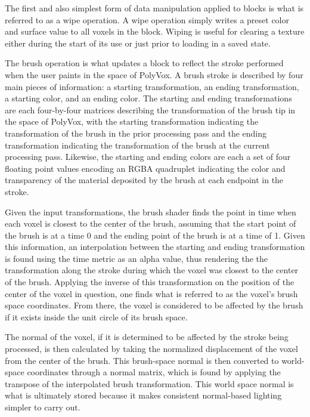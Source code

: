 \documentclass[onecolumn, draftclsnofoot,10pt, compsoc]{IEEEtran}
\newcounter{threesection}[subsubsection]
\newcounter{foursection}[threesection]
\begin{document}

The first and also simplest form of data manipulation applied to blocks is what is referred to as a wipe operation.
A wipe operation simply writes a preset color and surface value to all voxels in the block.
Wiping is useful for clearing a texture either during the start of its use or just prior to loading in a saved state.

The brush operation is what updates a block to reflect the stroke performed when the user paints in the space of PolyVox.
A brush stroke is described by four main pieces of information: a starting transformation, an ending transformation, a starting color, and an ending color.
The starting and ending transformations are each four-by-four matrices describing the transformation of the brush tip in the space of PolyVox, with the starting transformation indicating the transformation of the brush in the prior processing pass and the ending transformation indicating the transformation of the brush at the current processing pass.
Likewise, the starting and ending colors are each a set of four floating point values encoding an RGBA quadruplet indicating the color and transparency of the material deposited by the brush at each endpoint in the stroke.

Given the input transformations, the brush shader finds the point in time when each voxel is closest to the center of the brush, assuming that the start point of the brush is at a time 0 and the ending point of the brush is at a time of 1.
Given this information, an interpolation between the starting and ending transformation is found using the time metric as an alpha value, thus rendering the the transformation along the stroke during which the voxel was closest to the center of the brush.
Applying the inverse of this transformation on the position of the center of the voxel in question, one finds what is referred to as the voxel’s brush space coordinates.
From there, the voxel is considered to be affected by the brush if it exists inside the unit circle of its brush space.

The normal of the voxel, if it is determined to be affected by the stroke being processed, is then calculated by taking the normalized displacement of the voxel from the center of the brush.
This brush-space normal is then converted to world-space coordinates through a normal matrix, which is found by applying the transpose of the interpolated brush transformation.
This world space normal is what is ultimately stored because it makes consistent normal-based lighting simpler to carry out.
\end{document}
